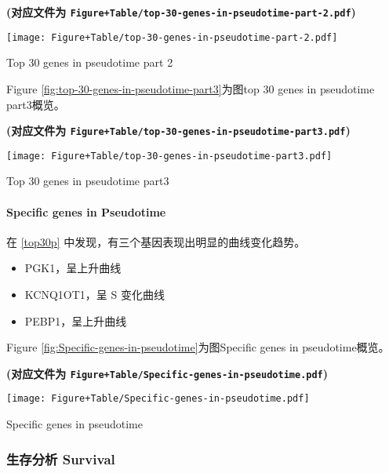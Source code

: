 \documentclass[
]{article}
\providecommand{\tightlist}{%
  \setlength{\itemsep}{0pt}\setlength{\parskip}{0pt}}
\begin{document}
\textbf{(对应文件为 \texttt{Figure+Table/top-30-genes-in-pseudotime-part-2.pdf})}

\def\@captype{figure}
\begin{center}
\texttt{[image: Figure+Table/top-30-genes-in-pseudotime-part-2.pdf]}
\caption{Top 30 genes in pseudotime part 2}\label{fig:top-30-genes-in-pseudotime-part-2}
\end{center}

Figure \ref{fig:top-30-genes-in-pseudotime-part3}为图top 30 genes in pseudotime part3概览。

\textbf{(对应文件为 \texttt{Figure+Table/top-30-genes-in-pseudotime-part3.pdf})}

\def\@captype{figure}
\begin{center}
\texttt{[image: Figure+Table/top-30-genes-in-pseudotime-part3.pdf]}
\caption{Top 30 genes in pseudotime part3}\label{fig:top-30-genes-in-pseudotime-part3}
\end{center}

\hypertarget{sp3}{%
\paragraph{Specific genes in Pseudotime}\label{sp3}}

在 \ref{top30p} 中发现，有三个基因表现出明显的曲线变化趋势。

\begin{itemize}
\tightlist
\item
  PGK1，呈上升曲线
\item
  KCNQ1OT1，呈 S 变化曲线
\item
  PEBP1，呈上升曲线
\end{itemize}

Figure \ref{fig:Specific-genes-in-pseudotime}为图Specific genes in pseudotime概览。

\textbf{(对应文件为 \texttt{Figure+Table/Specific-genes-in-pseudotime.pdf})}

\def\@captype{figure}
\begin{center}
\texttt{[image: Figure+Table/Specific-genes-in-pseudotime.pdf]}
\caption{Specific genes in pseudotime}\label{fig:Specific-genes-in-pseudotime}
\end{center}

\hypertarget{ux751fux5b58ux5206ux6790-survival}{%
\subsubsection{生存分析 Survival}\label{ux751fux5b58ux5206ux6790-survival}}
\end{document}
